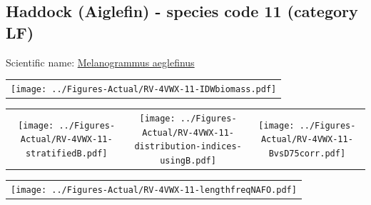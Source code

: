 \documentclass[12pt]{article}\usepackage[]{graphicx}\usepackage[]{color}
\begin{document}
\renewcommand\thefigure{\thesubsection\Alph{figure}}

\setcounter{figure}{0}

\hypertarget{sec:11}{%
\subsection{Haddock (Aiglefin) - species code 11 (category LF)}\label{sec:11}}

  


Scientific name: \href{http://www.marinespecies.org/aphia.php?p=taxdetails\&id=126437}{Melanogrammus aeglefinus} \newline
\begin{minipage}{1.0\textwidth}
 \begin{tabular}{c}
\texttt{[image: ../Figures-Actual/RV-4VWX-11-IDWbiomass.pdf]} \\ 
\end{tabular} 
\end{minipage}
\newline

\vspace{1cm}
\begin{minipage}{1.0\textwidth}
 \begin{tabular}{ccc}
\texttt{[image: ../Figures-Actual/RV-4VWX-11-stratifiedB.pdf]} & 
\texttt{[image: ../Figures-Actual/RV-4VWX-11-distribution-indices-usingB.pdf]} & 
\texttt{[image: ../Figures-Actual/RV-4VWX-11-BvsD75corr.pdf]} \\ 
\end{tabular} 
\end{minipage}
\clearpage
\begin{minipage}{1.0\textwidth}
 \begin{tabular}{c}
\texttt{[image: ../Figures-Actual/RV-4VWX-11-lengthfreqNAFO.pdf]} \\ 
\end{tabular} 
\end{minipage}
\newline
\end{document}
